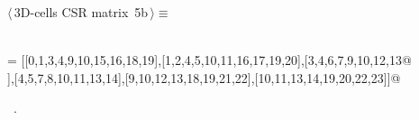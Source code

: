 \documentclass[11pt,oneside]{article}	%
\begin{document}
\begin{flushleft} \small
\begin{minipage}{\linewidth} \label{scrap10}
\protect{}$\langle\,$3D-cells CSR matrix\nobreak\ {\footnotesize 5b}$\,\rangle\equiv$
\vspace{-1ex}
\begin{list}{}{} \item
\mbox{}\verb@@\\
\mbox{}\verb@CV = [[0,1,3,4,9,10,15,16,18,19],[1,2,4,5,10,11,16,17,19,20],[3,4,6,7,9,10,12,13@\\
\mbox{}\verb@],[4,5,7,8,10,11,13,14],[9,10,12,13,18,19,21,22],[10,11,13,14,19,20,22,23]]@\\
\mbox{}\verb@@{\NWsep}
\end{list}
\vspace{-1ex}
\footnotesize\addtolength{\baselineskip}{-1ex}
\begin{list}{}{\setlength{\itemsep}{-\parsep}\setlength{\itemindent}{-\leftmargin}}
\item \NWtxtMacroRefIn\ .
\end{list}
\end{minipage}\\[4ex]
\end{flushleft}
\end{document}
